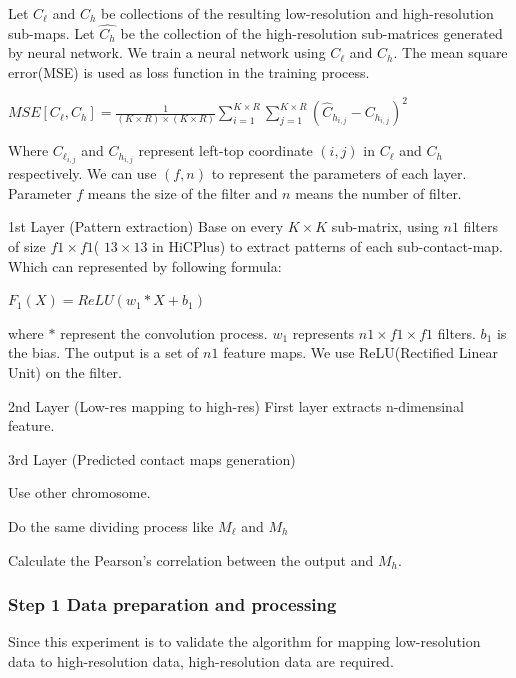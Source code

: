 \documentclass{article}
\begin{document}
\noindent Let $C_\ell$ and $C_h$ be collections of the resulting low-resolution and high-resolution
sub-maps. Let $\hat{C_h}$ be the collection of the high-resolution sub-matrices generated by neural network. We train a neural network using $C_\ell$ and $C_h$. The mean square error(MSE) is used as 
loss function in the training process. 



\begin{center}
    $MSE[C_\ell, C_h] = \frac{1}{(K \times R)\times (K \times R)} \sum_{i=1}^{K \times R} \sum_{j=1}^{K \times R} (\hat{C}_{h_{i,j}}-C_{h_{i,j}})^2$
\end{center}
Where $C_{\ell_{i,j}}$ and $C_{h_{i,j}}$ represent left-top coordinate $(i,j)$ in $C_\ell$ and $C_h$ respectively.
\noindent We can use $(f,n)$ to represent the parameters of each layer. Parameter $f$ means the size of the filter and $n$ means the number of filter. 


\noindent \large 1st Layer (Pattern extraction)
Base on every $K \times K$ sub-matrix, using $n1$ filters of size $f1 \times f1$( $13 \times 13$ in HiCPlus)
to extract patterns of each sub-contact-map. Which can represented by following formula:
\begin{center}
$F_1(X) = ReLU(w_1 * X + b_1)$
\end{center}
where $*$ represent the convolution process. $w_1$ represents $n1 \times f1 \times f1$ filters. $b_1$ is the bias. The output is a set of $n1$ feature maps. We use ReLU(Rectified Linear Unit) on the filter.
 

\noindent 2nd Layer (Low-res mapping to high-res)
First layer extracts n-dimensinal feature.


\noindent 3rd Layer (Predicted contact maps generation)


Use other chromosome. 

Do the same dividing process like $M_\ell$ and $M_h$

Calculate the Pearson's correlation between the output and $M_h$.







\subsubsection*{Step 1 Data preparation and processing}
Since this experiment is to validate the algorithm for mapping low-resolution data to high-resolution data, 
high-resolution data are required. 
\end{document}
